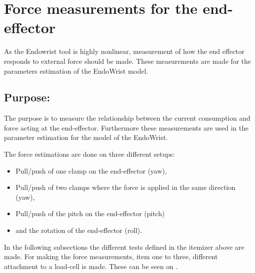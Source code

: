 \section{Force measurements for the end-effector} %

As the Endowrist tool is highly nonlinear, measurement of how the end effector responds to external force should be made. These measurements are made for the parameters estimation of the EndoWrist model.  

\subsection*{Purpose:}
The purpose is to measure the relationship between the current consumption and force acting at the end-effector. Furthermore these measurements are used in the parameter estimation for the model of the EndoWrist.

The force estimations are done on three different setups:
\begin{itemize}
\item Pull/push of one clamp on the end-effector (yaw),
\item Pull/push of two clamps where the force is applied in the same direction (yaw),
\item Pull/push of the pitch on the end-effector (pitch)
\item and the rotation of the end-effector (roll).
\end{itemize}

In the following subsections the different tests defined in the itemizer above are made. For making the force measurements, item one to three, different attachment to a load-cell is made. These can be seen on .


